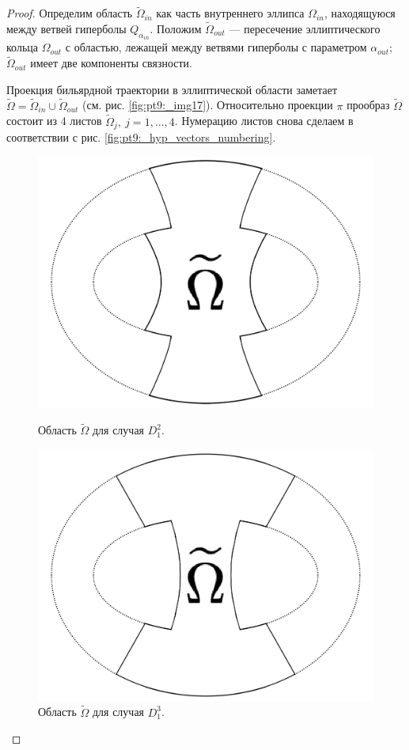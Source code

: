 \begin{proof}
Определим область $\widetilde{\Omega}_{in}$ как часть внутреннего эллипса $\Omega_{in}$, находящуюся между ветвей гиперболы $Q_{\alpha_{in}}$. Положим $\widetilde{\Omega}_{out}$ --- пересечение эллиптического кольца $\Omega_{out}$ с областью, лежащей между ветвями гиперболы с параметром $\alpha_{out}$; $\widetilde{\Omega}_{out}$ имеет две компоненты связности.

Проекция бильярдной траектории в эллиптической области заметает $\widetilde{\Omega} = \widetilde{\Omega}_{in} \cup \widetilde{\Omega}_{out}$ (см. рис.     \ref{fig:pt9:_img17}). Относительно проекции $\pi$ прообраз $\widetilde{\Omega}$ состоит из 4 листов $\widetilde{\Omega}_j, \ j=1, \ldots, 4$. 
Нумерацию листов снова сделаем в соответствии с рис. \ref{fig:pt9:_hyp_vectors_numbering}.

\begin{figure}[!htb]
\centering
\includegraphics[width=0.7\linewidth]{images/ch4/section2/img17.pdf}
    \caption{Область $\widetilde{\Omega}$ для случая $D_1^2$.}
    \label{fig:pt9:_img17}
\endminipage\hfill
{}
\centering
\includegraphics[width=0.7\linewidth]{images/ch4/section2/img18.pdf}
    \caption{Область $\widetilde{\Omega}$ для случая $D_1^3$.}
    \label{fig:pt9:_img18}
\endminipage\hfill
\end{figure}





\end{proof}
